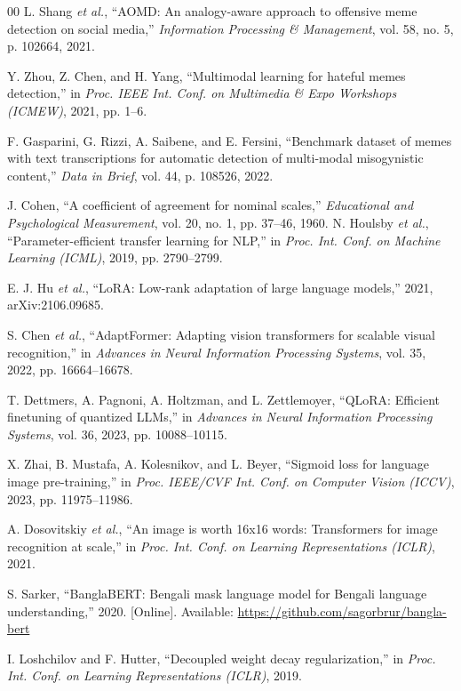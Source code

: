 \documentclass[conference]{IEEEtran}
\begin{document}
\begin{thebibliography}{00}
 L. Shang \textit{et al.}, ``AOMD: An analogy-aware approach to offensive meme detection on social media,'' \textit{Information Processing \& Management}, vol. 58, no. 5, p. 102664, 2021.

 Y. Zhou, Z. Chen, and H. Yang, ``Multimodal learning for hateful memes detection,'' in \textit{Proc. IEEE Int. Conf. on Multimedia \& Expo Workshops (ICMEW)}, 2021, pp. 1--6.

 F. Gasparini, G. Rizzi, A. Saibene, and E. Fersini, ``Benchmark dataset of memes with text transcriptions for automatic detection of multi-modal misogynistic content,'' \textit{Data in Brief}, vol. 44, p. 108526, 2022.

 J. Cohen, ``A coefficient of agreement for nominal scales,'' \textit{Educational and Psychological Measurement}, vol. 20, no. 1, pp. 37--46, 1960.
 N. Houlsby \textit{et al.}, ``Parameter-efficient transfer learning for NLP,'' in \textit{Proc. Int. Conf. on Machine Learning (ICML)}, 2019, pp. 2790--2799.

 E. J. Hu \textit{et al.}, ``LoRA: Low-rank adaptation of large language models,'' 2021, arXiv:2106.09685.

 S. Chen \textit{et al.}, ``AdaptFormer: Adapting vision transformers for scalable visual recognition,'' in \textit{Advances in Neural Information Processing Systems}, vol. 35, 2022, pp. 16664--16678.

 T. Dettmers, A. Pagnoni, A. Holtzman, and L. Zettlemoyer, ``QLoRA: Efficient finetuning of quantized LLMs,'' in \textit{Advances in Neural Information Processing Systems}, vol. 36, 2023, pp. 10088--10115.

 X. Zhai, B. Mustafa, A. Kolesnikov, and L. Beyer, ``Sigmoid loss for language image pre-training,'' in \textit{Proc. IEEE/CVF Int. Conf. on Computer Vision (ICCV)}, 2023, pp. 11975--11986.

 A. Dosovitskiy \textit{et al.}, ``An image is worth 16x16 words: Transformers for image recognition at scale,'' in \textit{Proc. Int. Conf. on Learning Representations (ICLR)}, 2021.

 S. Sarker, ``BanglaBERT: Bengali mask language model for Bengali language understanding,'' 2020. [Online]. Available: \url{https://github.com/sagorbrur/bangla-bert}

 I. Loshchilov and F. Hutter, ``Decoupled weight decay regularization,'' in \textit{Proc. Int. Conf. on Learning Representations (ICLR)}, 2019.


\end{thebibliography}
\end{document}
